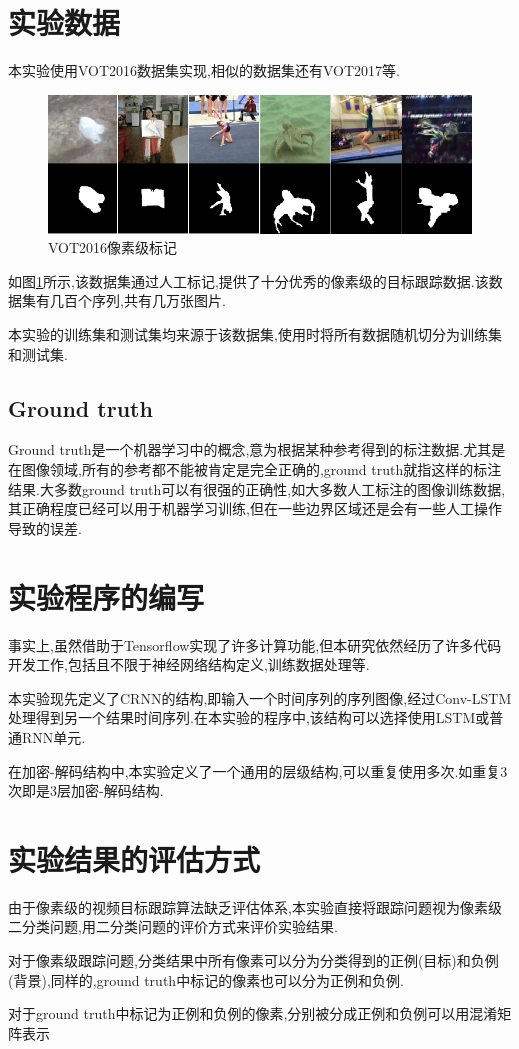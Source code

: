 \section{实验数据}
本实验使用VOT2016数据集\supercite{Vojir-TR-2017-01}实现,相似的数据集还有VOT2017等.
\par
\begin{figure}[htbp!]
    \centering
    \includegraphics[width = 1.\textwidth]{chap/img/vot_2016_pixel.png}
    \caption{VOT2016像素级标记}\label{fig:vot_2016_pixel}
\end{figure}
\par
如图\ref{fig:vot_2016_pixel}所示,该数据集通过人工标记,提供了十分优秀的像素级的目标跟踪数据.该数据集有几百个序列,共有几万张图片.
\par
本实验的训练集和测试集均来源于该数据集,使用时将所有数据随机切分为训练集和测试集.
\subsection{Ground truth}
Ground truth是一个机器学习中的概念,意为根据某种参考得到的标注数据.尤其是在图像领域,所有的参考都不能被肯定是完全正确的,ground truth就指这样的标注结果.大多数ground truth可以有很强的正确性,如大多数人工标注的图像训练数据,其正确程度已经可以用于机器学习训练,但在一些边界区域还是会有一些人工操作导致的误差.

\section{实验程序的编写}
事实上,虽然借助于Tensorflow实现了许多计算功能,但本研究依然经历了许多代码开发工作,包括且不限于神经网络结构定义,训练数据处理等.
\par
本实验现先定义了CRNN的结构,即输入一个时间序列的序列图像,经过Conv-LSTM处理得到另一个结果时间序列.在本实验的程序中,该结构可以选择使用LSTM或普通RNN单元.
\par
在加密-解码结构中,本实验定义了一个通用的层级结构,可以重复使用多次.如重复3次即是3层加密-解码结构.

\section{实验结果的评估方式}
由于像素级的视频目标跟踪算法缺乏评估体系,本实验直接将跟踪问题视为像素级二分类问题,用二分类问题的评价方式来评价实验结果.
\par
对于像素级跟踪问题,分类结果中所有像素可以分为分类得到的正例(目标)和负例(背景),同样的,ground truth中标记的像素也可以分为正例和负例.
\par
对于ground truth中标记为正例和负例的像素,分别被分成正例和负例可以用混淆矩阵表示
